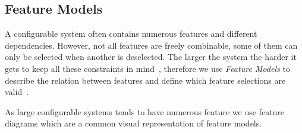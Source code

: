 \subsection{Feature Models}\label{ch:Feature-Model}

A configurable system often contains numerous features and different dependencies.
However, not all features are freely combinable, some of them can only be selected when another is deselected. 
The larger the system the harder it gets to keep all these constraints in mind~\cite{Feature-Oriented-Software-Product-Lines}, 
therefore we use \emph{Feature Models}
to describe the relation between features and define which feature selections are valid~\cite{Feature-Oriented-Software-Product-Lines}.

As large configurable systems tends to have numerous feature we use feature diagrams which are a common
visual representation of feature models.